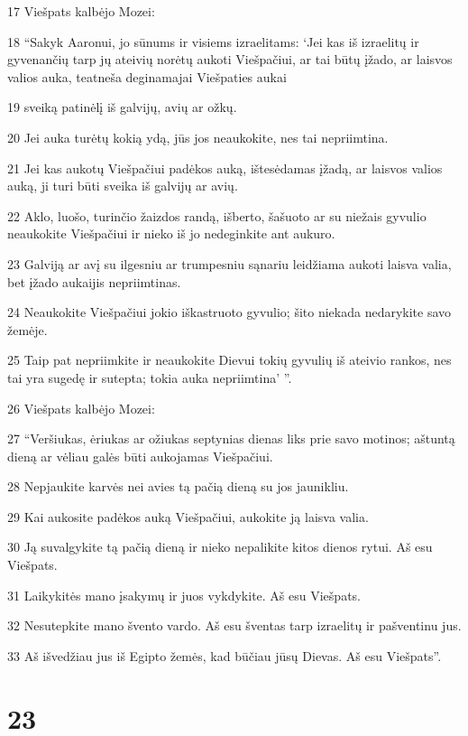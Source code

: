 \par 17 Viešpats kalbėjo Mozei: 
\par 18 “Sakyk Aaronui, jo sūnums ir visiems izraelitams: ‘Jei kas iš izraelitų ir gyvenančių tarp jų ateivių norėtų aukoti Viešpačiui, ar tai būtų įžado, ar laisvos valios auka, teatneša deginamajai Viešpaties aukai 
\par 19 sveiką patinėlį iš galvijų, avių ar ožkų. 
\par 20 Jei auka turėtų kokią ydą, jūs jos neaukokite, nes tai nepriimtina. 
\par 21 Jei kas aukotų Viešpačiui padėkos auką, ištesėdamas įžadą, ar laisvos valios auką, ji turi būti sveika iš galvijų ar avių. 
\par 22 Aklo, luošo, turinčio žaizdos randą, išberto, šašuoto ar su niežais gyvulio neaukokite Viešpačiui ir nieko iš jo nedeginkite ant aukuro. 
\par 23 Galviją ar avį su ilgesniu ar trumpesniu sąnariu leidžiama aukoti laisva valia, bet įžado aukai­jis nepriimtinas. 
\par 24 Neaukokite Viešpačiui jokio iškastruoto gyvulio; šito niekada nedarykite savo žemėje. 
\par 25 Taip pat nepriimkite ir neaukokite Dievui tokių gyvulių iš ateivio rankos, nes tai yra sugedę ir sutepta; tokia auka nepriimtina’ ”. 
\par 26 Viešpats kalbėjo Mozei: 
\par 27 “Veršiukas, ėriukas ar ožiukas septynias dienas liks prie savo motinos; aštuntą dieną ar vėliau galės būti aukojamas Viešpačiui. 
\par 28 Nepjaukite karvės nei avies tą pačią dieną su jos jaunikliu. 
\par 29 Kai aukosite padėkos auką Viešpačiui, aukokite ją laisva valia. 
\par 30 Ją suvalgykite tą pačią dieną ir nieko nepalikite kitos dienos rytui. Aš esu Viešpats. 
\par 31 Laikykitės mano įsakymų ir juos vykdykite. Aš esu Viešpats. 
\par 32 Nesutepkite mano švento vardo. Aš esu šventas tarp izraelitų ir pašventinu jus. 
\par 33 Aš išvedžiau jus iš Egipto žemės, kad būčiau jūsų Dievas. Aš esu Viešpats”.



\chapter{23}

